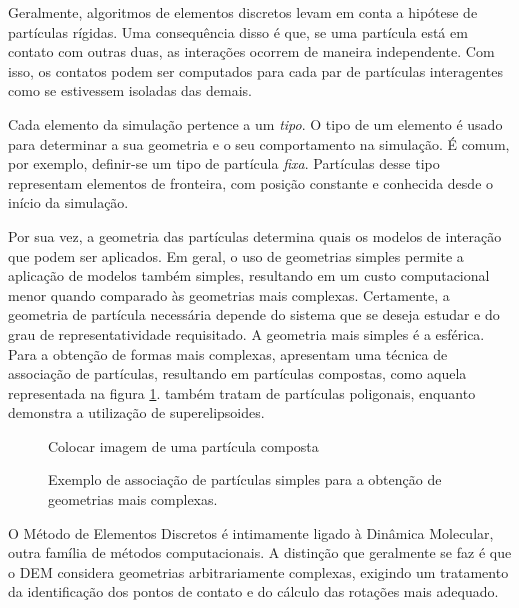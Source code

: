 Geralmente, algoritmos de elementos discretos levam em conta a hipótese de partículas rígidas. Uma consequência disso é que, se uma partícula está em contato com outras duas, as interações ocorrem de maneira independente. Com isso, os contatos podem ser computados para cada par de partículas interagentes como se estivessem isoladas das demais.

Cada elemento da simulação pertence a um \textit{tipo}. O tipo de um elemento é usado para determinar a sua geometria e o seu comportamento na simulação. É comum, por exemplo, definir-se um tipo de partícula \textit{fixa}. Partículas desse tipo representam elementos de fronteira, com posição constante e conhecida desde o início da simulação.  

Por sua vez, a geometria das partículas determina quais os modelos de interação que podem ser aplicados. Em geral, o uso de geometrias simples permite a aplicação de modelos também simples, resultando em um custo computacional menor quando comparado às geometrias mais complexas. Certamente, a geometria de partícula necessária depende do sistema que se deseja estudar e do grau de representatividade requisitado. A geometria mais simples é a esférica. Para a obtenção de formas mais complexas,  apresentam uma técnica de associação de partículas, resultando em partículas compostas, como aquela representada na figura \ref{fig:composite_particle}.  também tratam de partículas poligonais, enquanto  demonstra a utilização de superelipsoides.

\begin{figure}[h]
	\caption{Exemplo de associação de partículas simples para a obtenção de geometrias mais complexas.}
	\begin{center}
		\alert{Colocar imagem de uma partícula composta}
	\end{center}
	\label{fig:composite_particle}
\end{figure}

O Método de Elementos Discretos é intimamente ligado à Dinâmica Molecular, outra família de métodos computacionais. A distinção que geralmente se faz é que o DEM considera geometrias arbitrariamente complexas, exigindo um tratamento da identificação dos pontos de contato e do cálculo das rotações mais adequado.

